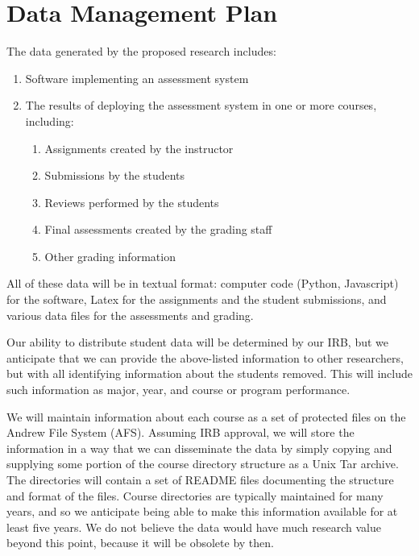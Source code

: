 \documentclass[12pt]{article}
\begin{document}
\section*{Data Management Plan}

The data generated by the proposed research includes:
\begin{enumerate}
\item Software implementing an assessment system
\item The results of deploying the assessment system in one or more
  courses, including:
\begin{enumerate}
\item
Assignments created by the instructor
\item Submissions by the students
\item Reviews performed by the students
\item Final assessments created by the grading staff
\item Other grading information
\end{enumerate}
\end{enumerate}

All of these data will be in textual format: computer code (Python,
Javascript) for the software, Latex for the assignments and the
student submissions, and various data files for the assessments and
grading.

Our ability to distribute student data will be determined by our IRB,
but we anticipate that we can provide
the above-listed information to other researchers,
but with all identifying information about the students removed.
This will include such information as major, year, and course or
program performance.

We will maintain information about each course as a set of protected
files on the Andrew File System (AFS)\@.  Assuming IRB approval, we
will store the information in a way that we can disseminate the data
by simply copying and supplying some portion of the course directory
structure as a Unix Tar archive.  The directories will contain a set
of README files documenting the structure and format of the files.
Course directories are typically maintained for many years, and so we
anticipate being able to make this information available for at least
five years.  We do not believe the data would have much research value
beyond this point, because it will be obsolete by then.
\end{document}

